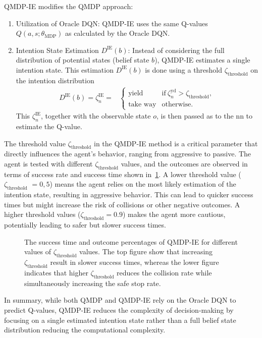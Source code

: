 QMDP-IE modifies the QMDP approach:
\begin{enumerate}
	\item Utilization of Oracle DQN: QMDP-IE uses the same Q-values \\ $Q(a,s;\theta_\mathrm{MDP})$ as calculated by the Oracle DQN.
	\item Intention State Estimation $D^\mathrm{IE}(b)$: Instead of considering the full distribution of potential states (belief state $b$), QMDP-IE estimates a single intention state. This estimation $D^\mathrm{IE}(b)$ is done using a threshold $\zeta_\mathrm{threshold}$ on the intention distribution
	\begin{align}
		D^\mathrm{IE}(b) = \zeta^\mathrm{IE}_n = & \begin{cases}
		\text{yield} & \text{if} \ \zeta_n^\text{yd} > \zeta_\text{threshold},\\
		\text{take way} & \text{otherwise.}
		\label{eq:IE_i}
		\end{cases} 
	\end{align}
	This $\zeta^\mathrm{IE}_n$, together with the observable state $o$, is then passed as to the \gls{nn} to estimate the Q-value.
\end{enumerate}
The threshold value $\zeta_\mathrm{threshold}$ in the QMDP-IE method is a critical parameter that directly influences the agent's behavior, ranging from aggressive to passive. The agent is tested with different $\zeta_\mathrm{threshold}$ values, and the outcomes are observed in terms of success rate and success time shown in~\ref{fig:thesis_intent_threshold}.
A lower threshold value ($\zeta_\mathrm{threshold}$ $= 0,5$) means the agent relies on the most likely estimation of the intention state, resulting in aggressive behavior. This can lead to quicker success times but might increase the risk of collisions or other negative outcomes. A higher threshold values ($\zeta_\mathrm{threshold}=0.9$) makes the agent more cautious, potentially leading to safer but slower success times.
\begin{figure}[ht]
	\centering
			
			\vspace{-0.8cm}
			\caption{The success time and outcome percentages of QMDP-IE for different values of  $\zeta_\mathrm{threshold}$ values. The top figure show that increasing $\zeta_\mathrm{threshold}$ result in slower success times, whereas the lower figure indicates that higher $\zeta_\mathrm{threshold}$ reduces the collision rate while simultaneously increasing the safe stop rate.}
	\label{fig:thesis_intent_threshold}
\end{figure}
In summary, while both QMDP and QMDP-IE rely on the Oracle DQN to predict Q-values, QMDP-IE reduces the complexity of decision-making by focusing on a single estimated intention state rather than a full belief state distribution reducing the computational complexity.


